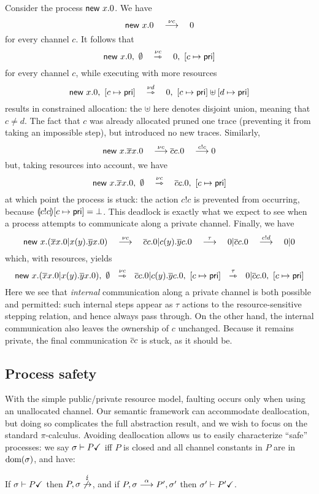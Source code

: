 \documentclass{entcs}
\begin{document}
Consider the process $\textsf{new } x. 0$.  We have
\[
  \textsf{new } x. 0\quad \stackrel{\nu c}{\longrightarrow}\quad 0
\]
for every channel $c$.  It follows that
\[
  \textsf{new } x. 0,\ \emptyset\quad \stackrel{\nu c}{\rightarrowtriangle}\quad 0,\ [c \mapsto \textsf{pri}]
\]
for every channel $c$, while executing with more resources
\[
  \textsf{new } x. 0,\ [c \mapsto \textsf{pri}]\quad \stackrel{\nu d}{\rightarrowtriangle}\quad 0,\ [c \mapsto \textsf{pri}] \uplus [d \mapsto \textsf{pri}]
\]
results in constrained allocation: the $\uplus$ here denotes disjoint
union, meaning that $c \neq d$.  The fact that $c$ was already
allocated pruned one trace (preventing it from taking an impossible
step), but introduced no new traces.  Similarly,
\[
  \textsf{new } x. \overline{x}x. 0\quad \stackrel{\nu c}{\longrightarrow} \overline{c}c.0\quad \stackrel{c!c}{\longrightarrow} 0
\]
but, taking resources into account, we have
\[
  \textsf{new } x. \overline{x}x. 0,\ \emptyset\quad \stackrel{\nu c}{\rightarrowtriangle}\quad
  \overline{c}c.0,\ [c \mapsto \textsf{pri}]
\]
at which point the process is stuck: the action $c!c$ is prevented
from occurring, because $\llparenthesis c!c \rrparenthesis [c\mapsto \textsf{pri}] = \bot$.  This
deadlock is exactly what we expect to see when a process attempts to
communicate along a private channel.  Finally, we have
\[
  \textsf{new } x. (\overline{x}x.0 | x(y).\overline{y}x.0)
\quad\stackrel{\nu c}{\longrightarrow}\quad
  \overline{c}c.0 | c(y).\overline{y}c.0
\quad\stackrel{\tau}{\longrightarrow}\quad
  0 | \overline{c}c.0
\quad\stackrel{c!d}{\longrightarrow}\quad
  0 | 0
\]
which, with resources, yields
\[
  \textsf{new } x. (\overline{x}x.0 | x(y).\overline{y}x.0),\ \emptyset
\ \ \stackrel{\nu c}{\rightarrowtriangle}\ \
  \overline{c}c.0 | c(y).\overline{y}c.0,\ [c \mapsto \textsf{pri}]
\ \ \stackrel{\tau}{\rightarrowtriangle}\ \
  0 | \overline{c}c.0,\ [c \mapsto \textsf{pri}]
\]
Here we see that \emph{internal} communication along a private channel
is both possible and permitted: such internal steps appear as $\tau$
actions to the resource-sensitive stepping relation, and hence always
pass through.  On the other hand, the internal communication also
leaves the ownership of $c$ unchanged.  Because it remains private,
the final communication $\overline{c}c$ is stuck, as it should be.

\subsection{Process safety}

With the simple public/private resource model, faulting occurs only
when using an unallocated channel.  Our semantic framework can
accommodate deallocation, but doing so complicates the full
abstraction result, and we wish to focus on the standard
$\pi$-calculus.  Avoiding deallocation allows us to easily
characterize ``safe'' processes: we say $\sigma \vdash P\checkmark$ iff $P$
is closed and all channel constants in $P$ are in $\textrm{dom}(\sigma)$, and have:
\begin{lemma}
  If $\sigma \vdash P \checkmark$ then
  $P,\sigma \stackrel{\lightning}{\not\rightarrow}$, and
  if $P,\sigma \stackrel{\alpha}{\longrightarrow} P',\sigma'$ then $\sigma' \vdash P' \checkmark$.
\end{lemma}
\end{document}
